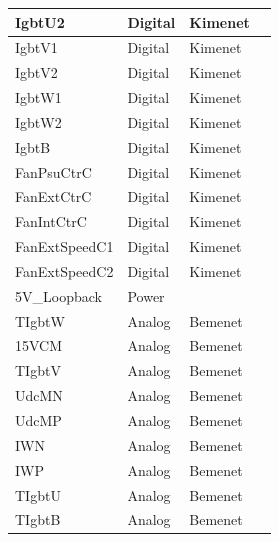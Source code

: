 \begin{table}[]
\begin{tabular}{|l|l|l|l|}
IgbtU2         & Digital      & Kimenet      &                                 \\ \hline
IgbtV1         & Digital      & Kimenet      &                                 \\ \hline
IgbtV2         & Digital      & Kimenet      &                                 \\ \hline
IgbtW1         & Digital      & Kimenet      &                                 \\ \hline
IgbtW2         & Digital      & Kimenet      &                                 \\ \hline
IgbtB          & Digital      & Kimenet      &                                 \\ \hline
FanPsuCtrC     & Digital      & Kimenet      &                                 \\ \hline
FanExtCtrC     & Digital      & Kimenet      &                                 \\ \hline
FanIntCtrC     & Digital      & Kimenet      &                                 \\ \hline
FanExtSpeedC1  & Digital      & Kimenet      &                                 \\ \hline
FanExtSpeedC2  & Digital      & Kimenet      &                                 \\ \hline
5V\_Loopback   & Power        &              &                                 \\ \hline
TIgbtW         & Analog       & Bemenet      &                                 \\ \hline
15VCM          & Analog       & Bemenet      &                                 \\ \hline
TIgbtV         & Analog       & Bemenet      &                                 \\ \hline
UdcMN          & Analog       & Bemenet      &                                 \\ \hline
UdcMP          & Analog       & Bemenet      &                                 \\ \hline
IWN            & Analog       & Bemenet      &                                 \\ \hline
IWP            & Analog       & Bemenet      &                                 \\ \hline
TIgbtU         & Analog       & Bemenet      &                                 \\ \hline
TIgbtB         & Analog       & Bemenet      &                                 \\ \hline

\end{tabular}
\end{table}
